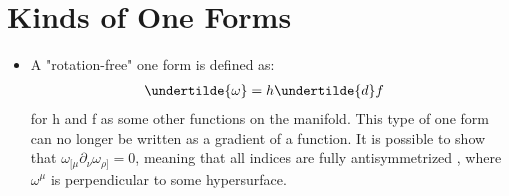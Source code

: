 \documentclass[11pt]{article}
\begin{document}
    \section{Kinds of One Forms}
    \begin{itemize}
    \item
    A "rotation-free" one form is defined as:
        \begin{equation}
            \begin{aligned}
            \undertilde{\omega} &= h \undertilde{d}f
            \end{aligned}
        \end{equation}
    for h and f as some other functions on the manifold. This type of one form can no longer be written as a gradient of a function. It is possible to show that $\omega_{[\mu} \partial_\nu \omega_{\rho]} = 0$, meaning that all indices are fully antisymmetrized
    , where $\omega^\mu$ is perpendicular to some hypersurface.\\
    \begin{figure} [H]
        \begin{center}


\begin{tikzpicture}[x=0.75pt,y=0.75pt,yscale=-1,xscale=1]


\end{tikzpicture}
\end{center}
\end{figure}
\end{itemize}
\end{document}
